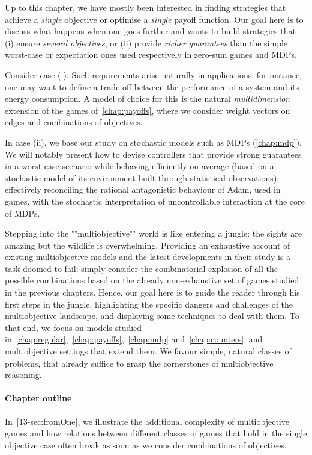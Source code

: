 



Up to this chapter, we have mostly been interested in finding strategies that achieve a \emph{single} objective or optimise a \emph{single} payoff function. Our goal here is to discuss what happens when one goes further and wants to build strategies that (i) ensure \emph{several objectives}, or (ii) provide \emph{richer guarantees} than the simple worst-case or expectation ones used respectively in zero-sum games and MDPs. 

Consider case (i). Such requirements arise naturally in applications: for instance, one may want to define a trade-off between the performance of a system and its energy consumption. A model of choice for this is the natural \textit{multidimension} extension of the games of~\cref{chap:payoffs}, where we consider weight vectors on edges and combinations of objectives.

In case (ii), we base our study on stochastic models such as MDPs (\cref{chap:mdp}). We will notably present how to devise controllers that provide strong guarantees in a worst-case scenario while behaving efficiently on average (based on a stochastic model of its environment built through statistical observations); effectively reconciling the rational antagonistic behaviour of Adam, used in games, with the stochastic interpretation of uncontrollable interaction at the core of MDPs.

Stepping into the ""multiobjective"" world is like entering a jungle: the sights are amazing but the wildlife is overwhelming. Providing an exhaustive account of existing multiobjective models and the latest developments in their study is a task doomed to fail: simply consider the combinatorial explosion of all the possible combinations based on the already non-exhaustive set of games studied in the previous chapters. Hence, our goal here is to guide the reader through his first steps in the jungle, highlighting the specific dangers and challenges of the multiobjective landscape, and displaying some techniques to deal with them. To that end, we focus on models studied in~\cref{chap:regular},~\cref{chap:payoffs},~\cref{chap:mdp} and~\cref{chap:counters}, and multiobjective settings that extend them. We favour simple, natural classes of problems, that already suffice to grasp the cornerstones of multiobjective reasoning. 

\paragraph{Chapter outline} In~\cref{13-sec:fromOne}, we illustrate the additional complexity of multiobjective games and how relations between different classes of games that hold in the single objective case often break as soon as we consider combinations of objectives. 

